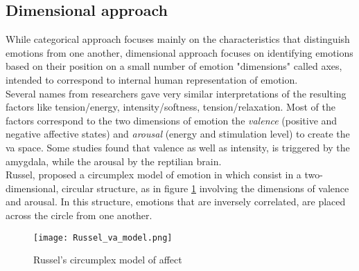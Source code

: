 \subsection{Dimensional approach} \label{dimensional_approach}
While categorical approach focuses mainly on the characteristics that distinguish emotions from one another, dimensional approach focuses on identifying emotions based on their position on a small number of emotion "dimensions" called axes, intended to correspond to internal human representation of emotion.
\\ \indent
Several names from researchers gave very similar interpretations of the resulting factors like tension/energy, intensity/softness, tension/relaxation. Most of the factors correspond to the two dimensions of emotion the \textit{valence} (positive and negative affective states) and \textit{arousal} (energy and stimulation level) to create the \gls{va} space. Some studies found that valence as well as intensity, is triggered by the amygdala, while the arousal by the reptilian brain.
\\
Russel, proposed a circumplex model of emotion in \cite{russell1980circumplex} which consist in a two-dimensional, circular structure, as in figure \ref{fig:Russel_va_model} involving the dimensions of valence and arousal. In this structure, emotions that are inversely correlated, are placed across the circle from one another.
\begin{figure}[h]
    \centering
    \texttt{[image: Russel\_va\_model.png]} 
	\caption{Russel's circumplex model of affect}
    \label{fig:Russel_va_model}
\end{figure}

